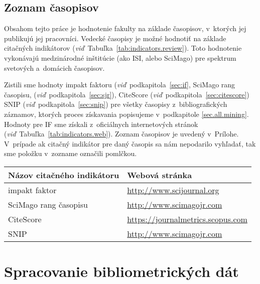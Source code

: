 \subsection{Zoznam časopisov}
\label{sec:journal.mining}

Obsahom tejto práce je hodnotenie fakulty na základe časopisov, v~ktorých jej
publikujú jej pracovníci.  Vedecké časopisy je možné hodnotiť na základe
citačných indikátorov (\emph{viď}~Tabuľka~\ref{tab:indicators.review}).  Toto
hodnotenie vykonávajú medzinárodné inštitúcie (ako ISI, alebo SciMago) pre
spektrum svetových a~domácich časopisov.

Zistili sme hodnoty impakt faktoru (\emph{viď}~podkapitola~\ref{sec:if}, SciMago
rang časopisu, (\emph{viď}~podkapitola~\ref{sec:sjr}), CiteScore
(\emph{viď}~podkapitola~\ref{sec:citescore}) SNIP
(\emph{viď}~podkapitola~\ref{sec:snip}) pre všetky časopisy z~bibliografických
záznamov, ktorých proces získavania popisujeme v~podkapitole
\ref{sec.all.mining}.  Hodnoty pre IF sme získali z~oficiálnych internetových
stránok (\emph{viď}~Tabuľka~\ref{tab:indicators.web}).  Zoznam časopisov je
uvedený v~Prílohe.  V~prípade ak citačný indikátor pre daný časopis sa nám
nepodarilo vyhľadať, tak sme položku v~zozname označili pomlčkou.

\begin{SCtable}
  \centering\small
  \caption[Webové stránky citačných indikátorov na hodnotenie časopisov]%
  {Zoznam citačných indikátorov na hodnotenie časopisov, s~odkazmi na oficiálne
    webové stránky.}
  \label{tab:indicators.web}
  \begin{tabular}{ll}
    \toprule
    Názov citačného indikátoru      & Webová stránka\\
    \midrule
    impakt faktor         & {\footnotesize \url{http://www.scijournal.org}}         \\
    SciMago rang časopisu & {\footnotesize \url{http://www.scimagojr.com}}          \\
    CiteScore             & {\footnotesize \url{https://journalmetrics.scopus.com}} \\
    SNIP                  & {\footnotesize \url{http://www.scimagojr.com}}          \\
    \bottomrule
  \end{tabular}
\end{SCtable}

\section{Spracovanie bibliometrických dát}

